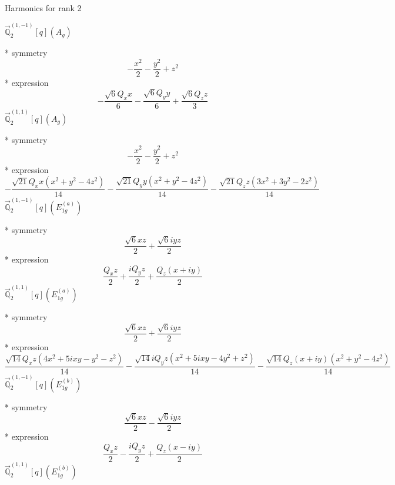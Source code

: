 \documentclass[fleqn,8pt]{jsarticle}
\begin{document}
\noindent * Harmonics for rank 2

\noindent\quad $\vec{\mathbb{Q}}_{2}^{(1,-1)}[q](A_{g})$

\noindent\quad ** symmetry
\begin{dmath*}
- \frac{x^{2}}{2} - \frac{y^{2}}{2} + z^{2}
\end{dmath*}
\noindent\quad ** expression
\begin{dmath*}
- \frac{\sqrt{6} Q_{x} x}{6} - \frac{\sqrt{6} Q_{y} y}{6} + \frac{\sqrt{6} Q_{z} z}{3}
\end{dmath*}
\noindent\quad $\vec{\mathbb{Q}}_{2}^{(1,1)}[q](A_{g})$

\noindent\quad ** symmetry
\begin{dmath*}
- \frac{x^{2}}{2} - \frac{y^{2}}{2} + z^{2}
\end{dmath*}
\noindent\quad ** expression
\begin{dmath*}
- \frac{\sqrt{21} Q_{x} x \left(x^{2} + y^{2} - 4 z^{2}\right)}{14} - \frac{\sqrt{21} Q_{y} y \left(x^{2} + y^{2} - 4 z^{2}\right)}{14} - \frac{\sqrt{21} Q_{z} z \left(3 x^{2} + 3 y^{2} - 2 z^{2}\right)}{14}
\end{dmath*}
\noindent\quad $\vec{\mathbb{Q}}_{2}^{(1,-1)}[q](E_{1g}^{(a)})$

\noindent\quad ** symmetry
\begin{dmath*}
\frac{\sqrt{6} x z}{2} + \frac{\sqrt{6} i y z}{2}
\end{dmath*}
\noindent\quad ** expression
\begin{dmath*}
\frac{Q_{x} z}{2} + \frac{i Q_{y} z}{2} + \frac{Q_{z} \left(x + i y\right)}{2}
\end{dmath*}
\noindent\quad $\vec{\mathbb{Q}}_{2}^{(1,1)}[q](E_{1g}^{(a)})$

\noindent\quad ** symmetry
\begin{dmath*}
\frac{\sqrt{6} x z}{2} + \frac{\sqrt{6} i y z}{2}
\end{dmath*}
\noindent\quad ** expression
\begin{dmath*}
\frac{\sqrt{14} Q_{x} z \left(4 x^{2} + 5 i x y - y^{2} - z^{2}\right)}{14} - \frac{\sqrt{14} i Q_{y} z \left(x^{2} + 5 i x y - 4 y^{2} + z^{2}\right)}{14} - \frac{\sqrt{14} Q_{z} \left(x + i y\right) \left(x^{2} + y^{2} - 4 z^{2}\right)}{14}
\end{dmath*}
\noindent\quad $\vec{\mathbb{Q}}_{2}^{(1,-1)}[q](E_{1g}^{(b)})$

\noindent\quad ** symmetry
\begin{dmath*}
\frac{\sqrt{6} x z}{2} - \frac{\sqrt{6} i y z}{2}
\end{dmath*}
\noindent\quad ** expression
\begin{dmath*}
\frac{Q_{x} z}{2} - \frac{i Q_{y} z}{2} + \frac{Q_{z} \left(x - i y\right)}{2}
\end{dmath*}
\noindent\quad $\vec{\mathbb{Q}}_{2}^{(1,1)}[q](E_{1g}^{(b)})$
\end{document}
